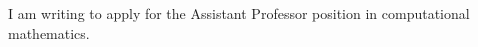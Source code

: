 \documentclass[family=academic]{careerdossier-letter}
\begin{document}
\MakeCDossierLetterhead

I am writing to apply for the Assistant Professor position in computational mathematics.

\MakeCDossierClosing
\end{document}
